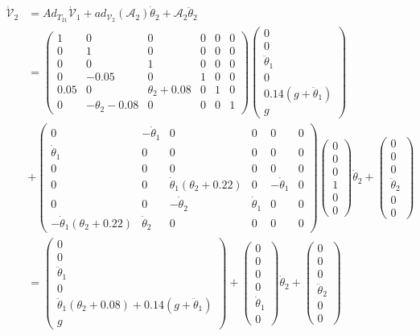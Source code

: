 \documentclass[]{scrreprt}
\newcommand{\myvec}[1]{\left(\begin{array}{c}#1\end{array}\right)}
\begin{document}
\newcommand{\vdot}[1]{\dot{\mathcal{V}}_{#1}}
\newcommand{\tdot}[1]{\dot{\theta}_{#1}}
\newcommand{\tddot}[1]{\ddot{\theta}_{#1}}
\begin{align*}
\vdot{2} &= Ad_{T_{21}}\vdot{1} + ad_{\mathcal{V}_2}(\mathcal{A}_2)\dot{\theta}_2+\mathcal{A}_2\ddot{\theta}_2\\
& = \left(\begin{array}{cccccc}
1 & 0 & 0 & 0 & 0 & 0 \\
0 & 1 & 0 & 0 & 0 & 0 \\
0 & 0 & 1 & 0 & 0 & 0 \\
0 & -0.05 & 0 & 1 & 0 & 0 \\
0.05 & 0 & \theta_2+0.08 & 0 & 1 & 0 \\
0 & -\theta_2-0.08 & 0 & 0 & 0 & 1
\end{array}\right)
\myvec{0\\0\\\tddot{1}\\0\\0.14(g+\tddot{1})\\g}\\
&+
\left(\begin{array}{cccccc}
	0 & -\tdot{1} & 0 & 0 & 0 & 0 \\
	\tdot{1} & 0 & 0 & 0 & 0 & 0 \\
	0 & 0 & 0 & 0 & 0 & 0 \\
	0 & 0 & \tdot{1}(\theta_2+0.22) & 0 & -\tdot{1} & 0 \\
	0 & 0 & -\tdot{2} & \tdot{1} & 0 & 0 \\
	-\tdot{1}(\theta_2+0.22) & \tdot{2} & 0 & 0 & 0 & 0
\end{array}\right)
\myvec{0\\0\\0\\1\\0\\0}\tdot{2}+\myvec{0\\0\\0\\\tddot{2}\\0\\0}\\
&=\myvec{0\\0\\\tddot{1}\\0\\\tddot{1}(\theta_2+0.08)+0.14(g+\tddot{1})\\g}+
\myvec{0\\0\\0\\0\\\tdot{1}\\0}\tdot{2}+\myvec{0\\0\\0\\\tddot{2}\\0\\0}\\

\end{align*}
\end{document}
